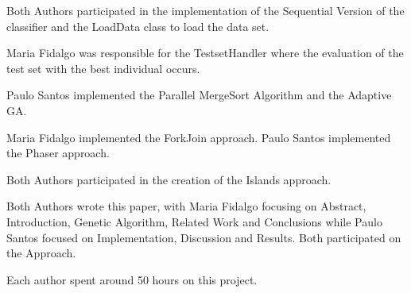 \documentclass[runningheads]{llncs}
\begin{document}
Both Authors participated in the implementation of the Sequential Version of the classifier and the LoadData class to load the data set.

Maria Fidalgo was responsible for the TestsetHandler where the evaluation of the test set with the best individual occurs.

Paulo Santos implemented the Parallel MergeSort Algorithm and the Adaptive GA.

Maria Fidalgo implemented the ForkJoin approach. Paulo Santos implemented the Phaser approach.

Both Authors participated in the creation of the Islands approach.

Both Authors wrote this paper, with Maria Fidalgo focusing on Abstract, Introduction, Genetic Algorithm, Related Work and Conclusions while Paulo Santos focused on Implementation, Discussion and Results. Both participated on the Approach.

Each author spent around 50 hours on this project.



\end{document}
